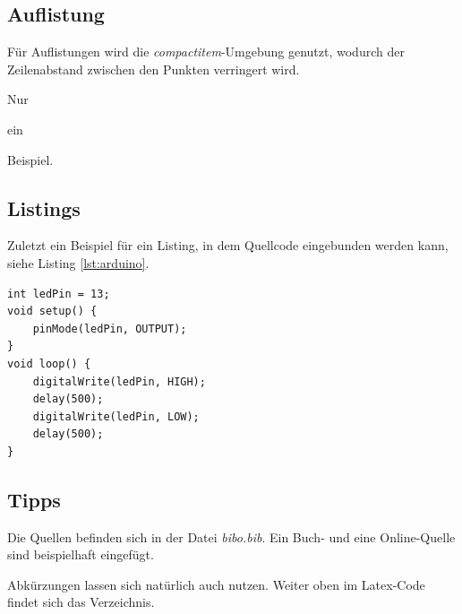 \documentclass[12pt,a4paper,bibliography=totocnumbered,listof=totoc]{scrartcl}
\begin{document}
\pagebreak
\subsection{Auflistung}
Für Auflistungen wird die \textit{compactitem}-Umgebung genutzt, wodurch der Zeilenabstand zwischen den Punkten verringert wird.

\begin{compactitem}
	\item Nur
	\item ein
	\item Beispiel.
\end{compactitem}

\subsection{Listings}
Zuletzt ein Beispiel für ein Listing, in dem Quellcode eingebunden werden kann, siehe Listing \ref{lst:arduino}.

\vspace{1em}
\begin{lstlisting}[caption=Arduino Beispielprogramm, label=lst:arduino]
int ledPin = 13;
void setup() {
    pinMode(ledPin, OUTPUT);
}
void loop() {
    digitalWrite(ledPin, HIGH);
    delay(500);
    digitalWrite(ledPin, LOW);
    delay(500);
}
\end{lstlisting}

\subsection{Tipps}
Die Quellen befinden sich in der Datei \textit{bibo.bib}. Ein Buch- und eine Online-Quelle sind beispielhaft eingefügt.

Abkürzungen lassen sich natürlich auch nutzen. Weiter oben im Latex-Code findet sich das Verzeichnis.
\pagebreak






\end{document}
